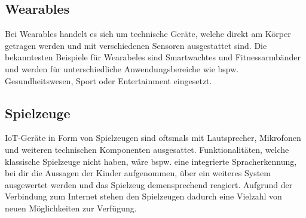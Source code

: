 \subsection{Wearables}
Bei Wearables handelt es sich um technische Geräte, welche direkt am Körper getragen werden und mit verschiedenen 
Sensoren ausgestattet sind. Die bekanntesten Beispiele für Wearabeles sind Smartwachtes und Fitnessarmbänder und 
werden für unterschiedliche Anwendungsbereiche wie bspw. Gesundheitswesen, Sport oder Entertainment eingesetzt.


\subsection{Spielzeuge}
IoT-Geräte in Form von Spielzeugen sind oftsmals mit Lautsprecher, Mikrofonen und weiteren technischen Komponenten ausgesattet.
Funktionalitäten, welche klassische Spielzeuge nicht haben, wäre bspw. eine integrierte
Spracherkennung, bei dir die Aussagen der Kinder aufgenommen, über ein weiteres System ausgewertet werden und das Spielzeug
demensprechend reagiert. Aufgrund der Verbindung zum Internet stehen den Spielzeugen dadurch eine Vielzahl von neuen Möglichkeiten
zur Verfügung.